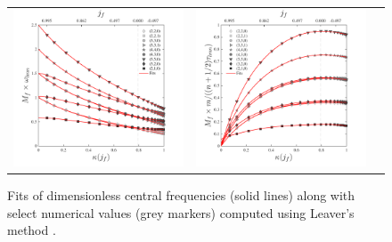 \documentclass[twocolumn,aps,prd,floatfix,preprintnumbers,a4paper,nofootinbib,
superscriptaddress,10pt]{revtex4-1}
\begin{document}
\begin{figure}
  \begin{tabular}{lcr}
    \includegraphics[width=\figfactor\textwidth]{fig/fits_w.pdf} & \includegraphics[width=\figfactor\textwidth]{fig/fits_tau.pdf}
  \end{tabular}
	\caption{ Fits of dimensionless \qnm{} central frequencies (solid lines) along with select numerical values (grey markers) computed using Leaver's method \cite{Leaver85}.
}
\end{figure}
\end{document}
